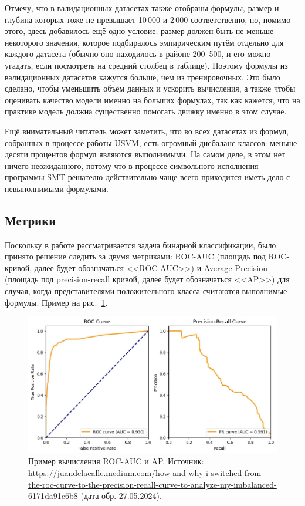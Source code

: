 Отмечу, что в валидационных датасетах также отобраны формулы, размер и глубина которых тоже не превышает 10\,000 и 2\,000 соответственно, но, помимо этого, здесь добавилось ещё одно условие: размер должен быть не меньше некоторого значения, которое подбиралось эмпирическим путём отдельно для каждого датасета (обычно оно находилось в районе 200--500, и его можно угадать, если посмотреть на средний столбец в таблице). Поэтому формулы из валидационных датасетов кажутся больше, чем из тренировочных. Это было сделано, чтобы уменьшить объём данных и ускорить вычисления, а также чтобы оценивать качество модели именно на больших формулах, так как кажется, что на практике модель должна существенно помогать движку именно в этом случае.

Ещё внимательный читатель может заметить, что во всех датасетах из формул, собранных в процессе работы USVM, есть огромный дисбаланс классов: меньше десяти процентов формул являются выполнимыми. На самом деле, в этом нет ничего неожиданного, потому что в процессе символьного исполнения программы SMT-решателю действительно чаще всего приходится иметь дело с невыполнимыми формулами.

\subsection{Метрики}

Поскольку в работе рассматривается задача бинарной классификации, было принято решение следить за двумя метриками: ROC-AUC (площадь под ROC-кривой, далее будет обозначаться <<ROC-AUC>>) и Average Precision (площадь под precision-recall кривой, далее будет обозначаться <<AP>>) для случая, когда представителями положительного класса считаются выполнимые формулы. Пример на рис.~\ref{roc-auc-vs-au-prc}.

\begin{figure}[!ht]
\begin{center}
    \includegraphics[scale=0.5]{./assets/roc-auc-vs-au-prc.jpg}
    \caption{\label{roc-auc-vs-au-prc} Пример вычисления ROC-AUC и AP. Источник: \url{https://juandelacalle.medium.com/how-and-why-i-switched-from-the-roc-curve-to-the-precision-recall-curve-to-analyze-my-imbalanced-6171da91c6b8} (дата обр. 27.05.2024).}
\end{center}
\end{figure}


